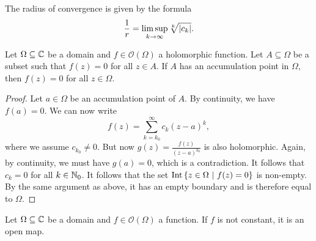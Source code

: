 \begin{opomba}
The radius of convergence is given by the formula
\[
\frac{1}{r} = \limsup_{k \to \infty} \sqrt[k]{\left\lvert c_k\right\rvert}.
\]
\end{opomba}

\begin{izrek}[Identity]
Let $\Omega \subseteq \mathbb{C}$ be a domain and
$f \in \mathcal{O}(\Omega)$ a holomorphic function. Let
$A \subseteq \Omega$ be a subset such that $f(z) = 0$ for all
$z \in A$. If $A$ has an accumulation point in $\Omega$, then
$f(z) = 0$ for all $z \in \Omega$.
\end{izrek}

\begin{proof}
Let $a \in \Omega$ be an accumulation point of $A$. By continuity,
we have $f(a) = 0$. We can now write
\[
f(z) = \sum_{k=k_0}^\infty c_k (z - a)^k,
\]
where we assume $c_{k_0} \ne 0$. But now
$g(z) = \frac{f(z)}{(z-a)^{k_0}}$ is also holomorphic. Again, by
continuity, we must have $g(a) = 0$, which is a contradiction. It
follows that $c_k = 0$ for all $k \in \mathbb{N}_0$. It follows that the
set $\operatorname{Int} \left\{z \in \Omega~\middle\vert~f(z) = 0\right\}$ is non-empty. By the same
argument as above, it has an empty boundary and is therefore equal
to $\Omega$.
\end{proof}


\begin{izrek}
Let $\Omega \subseteq \mathbb{C}$ be a domain and
$f \in \mathcal{O}(\Omega)$ a function. If $f$ is not constant, it
is an open map.
\end{izrek}

